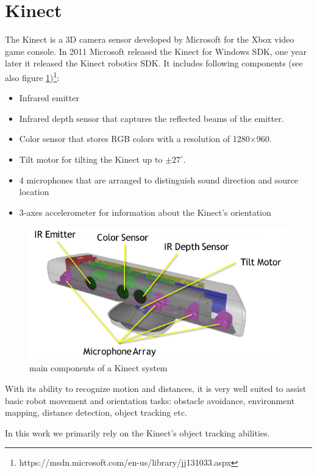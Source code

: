 \section{Kinect}
The Kinect is a 3D camera sensor developed by Microsoft for the Xbox video game console. In 2011 Microsoft released the Kinect for Windows SDK, one year later it released the Kinect robotics SDK. It includes following components (see also figure \ref{Kinect})\footnote{https://msdn.microsoft.com/en-us/library/jj131033.aspx}:

\begin{itemize}
\item Infrared emitter
\item Infrared depth sensor that captures the reflected beams of the emitter.
\item Color sensor that stores RGB colors with a resolution of 1280$\times$960.
\item Tilt motor for tilting the Kinect up to $\pm 27^\circ$.
\item 4 microphones that are arranged to distinguish sound direction and source location
\item 3-axes accelerometer for information about the Kinect's orientation
\end{itemize}

\begin{figure}[ht]
\centering
\includegraphics[scale=0.425]{graphics/kinect.png}
\caption{main components of a Kinect system}
\label{Kinect}
\centering
\end{figure}

With its ability to recognize motion and distances, it is very well suited to assist basic robot movement and orientation tasks: obstacle avoidance, environment mapping, distance detection, object tracking etc.

In this work we primarily rely on the Kinect's object tracking abilities.
  
